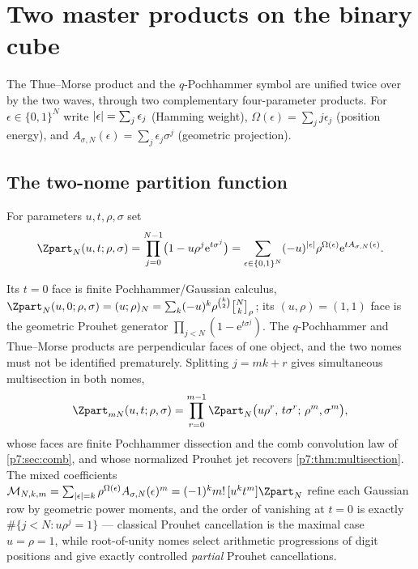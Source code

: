 \documentclass[11pt,oneside]{article}
\numberwithin{equation}{section}
\theoremstyle{definition}
\theoremstyle{remark}
\newcommand{\e}{\mathrm e}
\newcommand{\qbinom}[3]{\genfrac{[}{]}{0pt}{}{#1}{#2}_{#3}}
\begin{document}
\section{Two master products on the binary cube}
\label{p7:sec:master-products}

The Thue--Morse product and the $q$-Pochhammer symbol are unified twice over
by the two waves, through two complementary four-parameter products.  For
$\epsilon\in\{0,1\}^N$ write
$\left\lvert \epsilon\right\rvert=\sum_j\epsilon_j$ (Hamming weight),
$\Omega(\epsilon)=\sum_jj\epsilon_j$ (position energy), and
$A_{\sigma,N}(\epsilon)=\sum_j\epsilon_j\sigma^j$ (geometric projection).

\subsection{The two-nome partition function}

\begin{definition}
\label{p7:def:two-nome}
For parameters $u,t,\rho,\sigma$ set
\begin{equation}\label{p7:eq:Z-master}
 \Zpart_N(u,t;\rho,\sigma)=
 \prod_{j=0}^{N-1}\bigl(1-u\rho^j\e^{t\sigma^j}\bigr)
 =\sum_{\epsilon\in\{0,1\}^N}
 (-u)^{\abs\epsilon}\rho^{\Omega(\epsilon)}
 \e^{tA_{\sigma,N}(\epsilon)}.
\end{equation}
\end{definition}

Its $t=0$ face is finite Pochhammer/Gaussian calculus,
$\Zpart_N(u,0;\rho,\sigma)=(u;\rho)_N
=\sum_k(-u)^k\rho^{\binom k2}\qbinom Nk\rho$; its $(u,\rho)=(1,1)$ face is
the geometric Prouhet generator
$\prod_{j<N}(1-\e^{t\sigma^j})$.  The $q$-Pochhammer and Thue--Morse products
are perpendicular faces of one object, and the two nomes must not be
identified prematurely.  Splitting $j=mk+r$ gives simultaneous multisection in
both nomes,
\begin{equation}\label{p7:eq:Z-multisection}
 \Zpart_{mN}(u,t;\rho,\sigma)
 =\prod_{r=0}^{m-1}
 \Zpart_N\bigl(u\rho^r,\,t\sigma^r;\,\rho^m,\sigma^m\bigr),
\end{equation}
whose faces are finite Pochhammer dissection and the comb convolution law of
\cref{p7:sec:comb}, and whose normalized Prouhet jet recovers
\cref{p7:thm:multisection}.  The mixed coefficients
$\mathcal M_{N,k,m}=\sum_{\abs\epsilon=k}\rho^{\Omega(\epsilon)}
A_{\sigma,N}(\epsilon)^m=(-1)^km!\,[u^kt^m]\Zpart_N$ refine each Gaussian row
by geometric power moments, and the order of vanishing at $t=0$ is exactly
$\#\{j<N:u\rho^j=1\}$ --- classical Prouhet cancellation is the maximal case
$u=\rho=1$, while root-of-unity nomes select arithmetic progressions of digit
positions and give exactly controlled \emph{partial} Prouhet cancellations.
\end{document}
